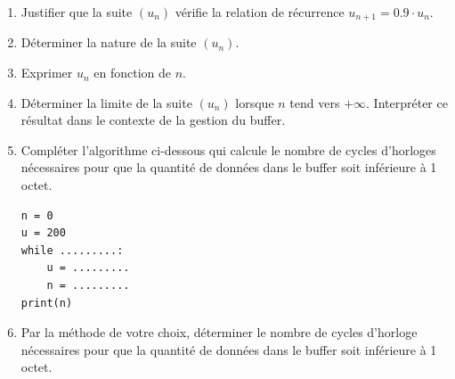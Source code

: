 \begin{enumerate}[series=monDS, resume]
    \item Justifier que la suite $(u_n)$ vérifie la relation de récurrence $u_{n+1}=0.9\cdot u_n$.
    \item Déterminer la nature de la suite $(u_n)$. 
    \item Exprimer $u_n$ en fonction de $n$. 
    \item Déterminer la limite de la suite $(u_n)$ lorsque $n$ tend vers $+\infty$. Interpréter ce résultat dans le contexte de la gestion du buffer.
    \item Compléter l'algorithme ci-dessous qui calcule le nombre de cycles d'horloges nécessaires pour que la quantité de données dans le buffer soit inférieure à 1 octet.

\begin{verbatim}
n = 0
u = 200
while .........:
    u = .........
    n = .........
print(n)
\end{verbatim}
    \item Par la méthode de votre choix, déterminer le nombre de cycles d'horloge nécessaires pour que la quantité de données dans le buffer soit inférieure à 1 octet.
\end{enumerate}

\bigskip




